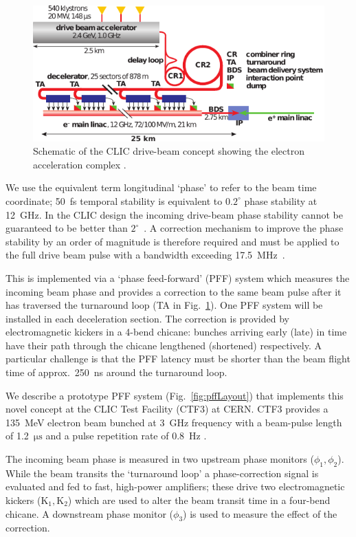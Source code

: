 \documentclass[%
 reprint,
 superscriptaddress,
 amsmath,
 amssymb,
 prl,
]{revtex4-1}
\begin{document}
\begin{figure}
	\includegraphics[width=\columnwidth]{figs/clicLayout}
	\caption{\label{fig:CLICLayout} Schematic of the CLIC drive-beam 
	concept showing the electron acceleration complex \cite{CLIC-staging}.
	}
\end{figure}


We use the equivalent term longitudinal ‘phase’ to refer to the beam time 
coordinate; 50~fs temporal stability is equivalent to \(0.2^\circ\) phase 
stability at 12~GHz. In the CLIC design the incoming drive-beam phase stability 
cannot be guaranteed to be better than \(2^\circ\)~\cite{CLICCDR}. A correction 
mechanism to improve the phase stability by an order of magnitude is 
therefore required and must be applied to the full drive beam pulse with a 
bandwidth exceeding 17.5~MHz~\cite{Gerber2015}. 

This is implemented via a `phase feed-forward' (PFF) system which measures the 
incoming beam phase and provides a correction to the same beam pulse 
after it has traversed the turnaround loop (TA in Fig.~\ref{fig:CLICLayout}). 
One PFF system will be installed in each deceleration section. The correction 
is provided by electromagnetic kickers in a 4-bend chicane: bunches arriving 
early (late) in time have their path through the chicane lengthened (shortened) 
respectively. A particular challenge is that the PFF latency must be shorter 
than the beam flight time of approx.~250~ns around the turnaround loop.

We describe a prototype PFF system (Fig.~\ref{fig:pffLayout}) that implements 
this novel concept at the CLIC Test Facility (CTF3) at CERN. CTF3 provides a 
135~MeV electron beam bunched at 3~GHz frequency with a beam-pulse length of 
1.2~\(\mathrm{\mu s}\) and a pulse repetition rate of 0.8~Hz \cite{CLICCDR}. 

The incoming beam phase is measured in two upstream phase 
monitors (\(\phi_{1}, \phi_{2}\)). While the beam 
transits the ‘turnaround loop’ a phase-correction signal is evaluated and fed 
to fast, high-power amplifiers; these drive two electromagnetic kickers 
(\(\mathrm{K_1, K_2}\)) which are used to alter the beam transit time in a 
four-bend chicane. A downstream phase monitor (\(\phi_{3}\)) is 
used to measure the effect of the correction. 
\end{document}
